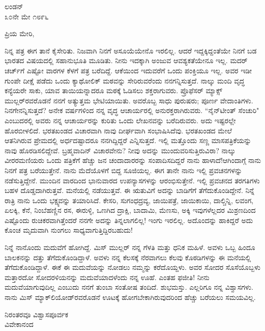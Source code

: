 \begin{flushright}
ಲಂಡನ್\\೩೦ನೇ ಮೇ ೧೮೯೬
\end{flushright}

\noindent
ಪ್ರಿಯ ಮೇರಿ,

ನಿನ್ನ ಪತ್ರ ಈಗ ತಾನೆ ಕೈಸೇರಿತು. ನಿಜವಾಗಿ ನಿನಗೆ ಅಸೂಯೆಯೇನೊ ಇರಲಿಲ್ಲ. ಆದರೆ ಇದ್ದಕ್ಕಿದ್ದಂತೆಯೇ ನಿನಗೆ ಬಡ ಭಾರತದ ವಿಷಯದಲ್ಲಿ ಸಹಾನುಭೂತಿ ಮೂಡಿತು. ನೀನು ಇದಕ್ಕಾಗಿ ಅಂಜುವ ಆವಶ್ಯಕತೆಯೇನೂ ಇಲ್ಲ. ಮದರ್‌ ಚರ್ಚ್‌ಗೆ ಎಷ್ಟೋ ವಾರಗಳ ಕೆಳಗೆ ಪತ್ರ ಬರೆದಿದ್ದೆ. ಆಕೆಯಿಂದ ಇದುವರೆಗೆ ಒಂದು ಪಂಕ್ತಿಯೂ ಇಲ್ಲ. ಅವರ ಇಡೀ ಗುಂಪೇ ದೀಕ್ಷೆ ಪಡೆದು ಒಂದು ಕ್ಯಾಥೋಲಿಕ್ ಮಠವನ್ನು ಸೇರಿರುವರೆಂದು ನನಗನ್ನಿಸುತ್ತದೆ. ನಾಲ್ಕು ಮಂದಿ ವೃದ್ಧ ಕನ್ಯೆಯರೇ ಸಾಕು, ಯಾವ ತಾಯಿಯನ್ನಾದರೂ ಮಠಕ್ಕೆ ಓಡಿಸಲು ಶಕ್ತರಾಗುವರು. ಪ್ರೊಫೆಸರ್‌ ಮ್ಯಾಕ್ಸ್ ಮುಲ್ಲರ್‌ರವರೊಡನೆ ನನಗೆ ಅತ್ಯುತ್ತಮ ಭೇಟಿಯಾಯಿತು. ಅವರೊಬ್ಬ ಸಾಧು ಪುರುಷರು; ಪೂರ್ಣ ವೇದಾಂತಿಗಳು. ನಿನಗೇನನ್ನಿಸುತ್ತದೆ? ಅನೇಕ ವರ್ಷಗಳಿಂದ ನನ್ನ ವೃದ್ಧ ಆಚಾರ್ಯರಲ್ಲಿ ಅನುರಕ್ತರಾಗಿರುವರು. “ನೈನ್‌ಟೀಂತ್ ಸೆಂಚುರಿ" ಎಂಬುದರಲ್ಲಿ ಅವರು ನನ್ನ ಆಚಾರ್ಯರನ್ನು ಕುರಿತು ಒಂದು ಲೇಖನವನ್ನು ಬರೆದಿರುವರು. ಅದು ಇಷ್ಟರಲ್ಲೇ ಹೊರಬೀಳಲಿದೆ. ಭರತಖಂಡದ ವಿಚಾರವಾಗಿ ನಾವು ದೀರ್ಘವಾಗಿ ಸಂಭಾಷಿಸಿದೆವು. ಭರತಖಂಡದ ಮೇಲೆ ಆತನಿಗಿರುವ ಪ್ರೇಮದಲ್ಲಿ ಅರ್ಧದಷ್ಟಾದರೂ ನನಗಿದ್ದಿದ್ದರೆ ಎನ್ನಿಸುತ್ತದೆ. ಇಲ್ಲಿ ಮತ್ತೊಂದು ಸಣ್ಣ ಮಾಸಪತ್ರಿಕೆಯನ್ನು ನಾವು ಹೊರಡಿಸಲಿದ್ದೇವೆ. ಬ್ರಹ್ಮವಾದಿನ್ ವಿಚಾರವೇನು? ನೀವು ಅದನ್ನು ಮುಂದುವರಿಸುತ್ತಿರುವಿರಾ? ನಾಲ್ಕು ವೀರರಮಣಿಯರು ಒಂದು ಪತ್ರಿಕೆಗೆ ಹೆಚ್ಚು ಜನ ಚಂದಾದಾರರನ್ನು ಸಂಪಾದಿಸದಿದ್ದರೆ ನಾನು ಹಾಳಾದೆ!ಆಗಿಂದಾಗ್ಗೆ ನಾನು ನಿನಗೆ ಪತ್ರ ಬರೆಯುತ್ತೇನೆ. ನಾನು ಮೆದೆಯೊಳಗೆ ಬಿದ್ದ ಸೂಜಿಯಲ್ಲ. ಈಗ ತಾನೇ ನಾನು ಇಲ್ಲಿ ಪ್ರವಚನಗಳನ್ನು ನಡೆಸುತ್ತಿದ್ದೇನೆ. ಮುಂದಿನ ವಾರದಿಂದ ಭಾನುವಾರದ ಉಪನ್ಯಾಸಗಳನ್ನು ಆರಂಭಿಸುತ್ತೇನೆ. ಇಲ್ಲಿ ಪ್ರವಚನದ ತರಗತಿಗಳು ಬಹಳ ದೊಡ್ಡದಾಗಿರುತ್ತವೆ. ಮನೆಯಲ್ಲಿ ನಡೆಯುತ್ತವೆ. ಈ ಋತುವಿಗೆ ಅದನ್ನು ಬಾಡಿಗೆಗೆ ತೆಗೆದುಕೊಂಡಿದ್ದೇನೆ. ನಿನ್ನೆ ರಾತ್ರಿ ನಾನು ಒಂದು ಭಕ್ಷ್ಯವನ್ನು ತಯಾರಿಸಿದೆ. ಕೇಸರಿ, ಸುಗಂಧದ್ರವ್ಯ, ಜಾಯಿಪತ್ರೆ, ಜಾಯಿಕಾಯಿ, ದಾಲ್ಚಿನ್ನಿ, ಲವಂಗ, ಏಲಕ್ಕಿ, ಕೆನೆ, ನಿಂಬೆಹಣ್ಣಿನ ರಸ, ಈರುಳ್ಳಿ, ಒಣಗಿದ ದ್ರಾಕ್ಷಿ, ಬಾದಾಮಿ, ಮೆಣಸು, ಅಕ್ಕಿ ಇವುಗಳೆಲ್ಲದರ ಮಿಶ್ರಣದಿಂದ ಎಷ್ಟೊಂದು ರುಚಿಕರವಾಗಿತ್ತೆಂದರೆ ನನಗೇ ಅದನ್ನು ತಿನ್ನಲಾಗಲಿಲ್ಲ! ಇಂಗು ಇರಲಿಲ್ಲ. ಅದೊಂದನ್ನು ಹಾಕಿದ್ದರೆ ಅದು ಕೊಂಚ ಮೃದುವಾಗಿ ನುಂಗಲು ಸಾಧ್ಯವಾಗುತ್ತಿದ್ದಿರಬಹುದು!

ನಿನ್ನೆ ನಾನೊಂದು ಮದುವೆಗೆ ಹೋಗಿದ್ದೆ. ಮಿಸ್ ಮುಲ್ಲರ್ ನನ್ನ ಗೆಳತಿ ಮತ್ತು ಧನಿಕ ಮಹಿಳೆ. ಅವಳು ಒಬ್ಬ ಹಿಂದೂ ಬಾಲಕನನ್ನು ದತ್ತು ತೆಗೆದುಕೊಂಡಿದ್ದಾಳೆ. ಅವಳು ನನ್ನ ಕೆಲಸಕ್ಕೆ ನೆರವಾಗಲು ಕೆಲವು ಕೊಠಡಿಗಳನ್ನು ಈ ಮನೆಯಲ್ಲಿ ತೆಗೆದುಕೊಂಡಿದ್ದಾಳೆ. ಈಕೆ ಈ ಮದುವೆಯನ್ನು ನೋಡಲು ನಮ್ಮನ್ನು ಕರೆದೊಯ್ದಳು. ಅವರ ಸೋದರ ಸೊಸೆಯೊಬ್ಬಳು ಮತ್ತಾರದೋ ಸೋದರಳಿಯನನ್ನು ಮದುವೆಯಾದಳೆಂದು ನನ್ನ ಊಹೆ. ಎಂತಹ ಫಜೀತಿ! ನೀನು ಮದುವೆಯಾಗುವುದಿಲ್ಲ ಎಂಬುದು ನನಗೆ ತುಂಬಾ ಸಂತೋಷ ತಂದಿದೆ. ಶುಭಮಸ್ತು. ಎಲ್ಲರಿಗೂ ನನ್ನ ವಿಶ್ವಾಸಗಳು. ನಾನು ಮಿಸ್ ಮ್ಯಾಕ್‌ಲಿಯೋಡ್‌ರವರೊಡನೆ ಊಟಕ್ಕೆ ಹೋಗಬೇಕಾಗಿರುವುದರಿಂದ ಹೆಚ್ಚು ಬರೆಯಲು ಸಮಯವಿಲ್ಲ.

{\flushright
ನಿರಂತರವೂ ವಿಶ್ವಾಸಪೂರ್ವಕ\\ವಿವೇಕಾನಂದ\par}

